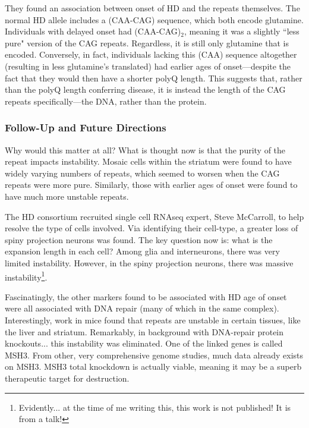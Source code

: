 They found an association between onset of HD and the repeats themselves. The normal HD allele includes a (CAA-CAG) sequence, which both encode glutamine. Individuals with delayed onset had (CAA-CAG)${}_2$, meaning it was a slightly ``less pure" version of the CAG repeats. Regardless, it is still only glutamine that is encoded. Conversely, in fact, individuals lacking this (CAA) sequence altogether (resulting in less glutamine's translated) had earlier ages of onset---despite the fact that they would then have a shorter polyQ length. This suggests that, rather than the polyQ length conferring disease, it is instead the length of the CAG repeats specifically---the DNA, rather than the protein.

\subsubsection*{Follow-Up and Future Directions}

Why would this matter at all? What is thought now is that the purity of the repeat impacts instability. Mosaic cells within the striatum were found to have widely varying numbers of repeats, which seemed to worsen when the CAG repeats were more pure. Similarly, those with earlier ages of onset were found to have much more unstable repeats.\newline 

The HD consortium recruited single cell RNAseq expert, Steve McCarroll, to help resolve the type of cells involved. Via identifying their cell-type, a greater loss of spiny projection neurons was found. The key question now is: what is the expansion length in each cell? Among glia and interneurons, there was very limited instability. However, in the spiny projection neurons, there was massive instability\footnote{Evidently... at the time of me writing this, this work is not published! It is from a talk!}.\newline

Fascinatingly, the other markers found to be associated with HD age of onset were all associated with DNA repair (many of which in the same complex). Interestingly, work in mice found that repeats are unstable in certain tissues, like the liver and striatum. Remarkably, in background with DNA-repair protein knockouts... this instability was eliminated. One of the linked genes is called MSH3. From other, very comprehensive genome studies, much data already exists on MSH3. MSH3 total knockdown is actually viable, meaning it may be a superb therapeutic target for destruction.\newline

